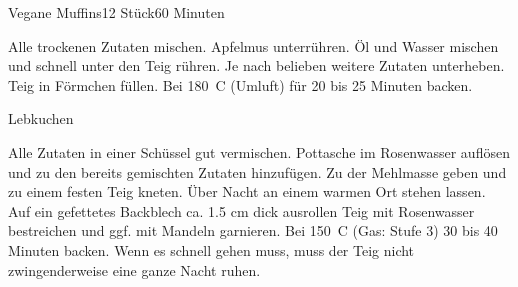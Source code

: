 \documentclass[a4paper,10pt]{article}
\begin{document}
    \begin{recipe}{Vegane Muffins}{12 Stück}{60 Minuten}
        
        \freeform \hfill 
        
            Alle trockenen Zutaten mischen.
            Apfelmus unterrühren.
            Öl und Wasser mischen und schnell unter den Teig rühren.
            Je nach belieben weitere Zutaten unterheben.
        \newstep
            Teig in Förmchen füllen. Bei 180~\degrees C (Umluft) für 20 bis 25 
            Minuten backen.
    \end{recipe}
    
    \newpage
    
    \begin{recipe}{Lebkuchen}{}{}
    
        \freeform \hfill 
      
        Alle Zutaten in einer Schüssel gut vermischen.
        Pottasche im Rosenwasser auflösen und zu den bereits gemischten Zutaten 
        hinzufügen.
        Zu der Mehlmasse geben und zu einem festen Teig kneten. \"Uber Nacht an 
        einem warmen Ort stehen lassen. Auf ein gefettetes Backblech ca. 1.5 cm 
        dick ausrollen
        Teig mit Rosenwasser bestreichen und ggf. mit Mandeln garnieren. Bei 
        150~\degrees C (Gas: Stufe 3) 30 bis 40 Minuten backen.
        \freeform Wenn es schnell gehen muss, muss der Teig nicht 
        zwingenderweise eine ganze Nacht ruhen.
    \end{recipe}
\end{document}
